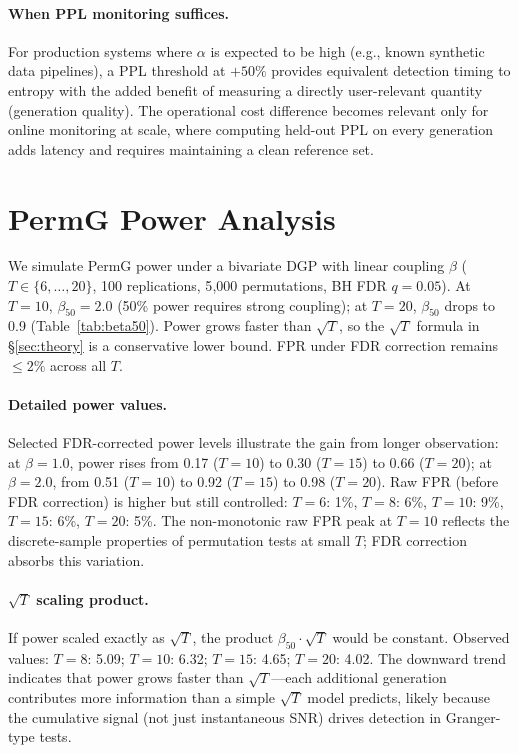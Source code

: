 \paragraph{When PPL monitoring suffices.}
For production systems where $\alpha$ is expected to be high (e.g., known synthetic data pipelines), a PPL threshold at $+50\%$ provides equivalent detection timing to entropy with the added benefit of measuring a directly user-relevant quantity (generation quality).
The operational cost difference becomes relevant only for online monitoring at scale, where computing held-out PPL on every generation adds latency and requires maintaining a clean reference set.


\section{PermG Power Analysis}
\label{app:power_analysis}

We simulate PermG power under a bivariate DGP with linear coupling $\beta$ ($T \in \{6,\ldots,20\}$, 100 replications, 5{,}000 permutations, BH FDR $q{=}0.05$).
At $T{=}10$, $\beta_{50}{=}2.0$ (50\% power requires strong coupling); at $T{=}20$, $\beta_{50}$ drops to 0.9 (Table~\ref{tab:beta50}).
Power grows faster than $\sqrt{T}$, so the $\sqrt{T}$ formula in \S\ref{sec:theory} is a conservative lower bound.
FPR under FDR correction remains ${\leq}2\%$ across all $T$.

\paragraph{Detailed power values.}
Selected FDR-corrected power levels illustrate the gain from longer observation: at $\beta{=}1.0$, power rises from 0.17 ($T{=}10$) to 0.30 ($T{=}15$) to 0.66 ($T{=}20$); at $\beta{=}2.0$, from 0.51 ($T{=}10$) to 0.92 ($T{=}15$) to 0.98 ($T{=}20$).
Raw FPR (before FDR correction) is higher but still controlled: $T{=}6$: 1\%, $T{=}8$: 6\%, $T{=}10$: 9\%, $T{=}15$: 6\%, $T{=}20$: 5\%.
The non-monotonic raw FPR peak at $T{=}10$ reflects the discrete-sample properties of permutation tests at small $T$; FDR correction absorbs this variation.

\paragraph{$\sqrt{T}$ scaling product.}
If power scaled exactly as $\sqrt{T}$, the product $\beta_{50} \cdot \sqrt{T}$ would be constant.
Observed values: $T{=}8$: 5.09; $T{=}10$: 6.32; $T{=}15$: 4.65; $T{=}20$: 4.02.
The downward trend indicates that power grows faster than $\sqrt{T}$---each additional generation contributes more information than a simple $\sqrt{T}$ model predicts, likely because the cumulative signal (not just instantaneous SNR) drives detection in Granger-type tests.

